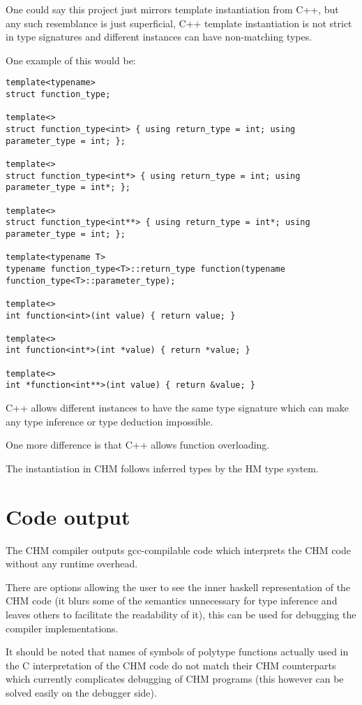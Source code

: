 One could say this project just mirrors template instantiation from C++, but any such resemblance is just superficial, C++ template instantiation is not strict in type signatures and different instances can have
non-matching types.

One example of this would be:


\begin{lstlisting}
template<typename>
struct function_type;

template<>
struct function_type<int> { using return_type = int; using parameter_type = int; };

template<>
struct function_type<int*> { using return_type = int; using parameter_type = int*; };

template<>
struct function_type<int**> { using return_type = int*; using parameter_type = int; };

template<typename T>
typename function_type<T>::return_type function(typename function_type<T>::parameter_type);

template<>
int function<int>(int value) { return value; }

template<>
int function<int*>(int *value) { return *value; }

template<>
int *function<int**>(int value) { return &value; }
\end{lstlisting}

C++ allows different instances to have the same type signature which can make any type inference or type deduction impossible.

One more difference is that C++ allows function overloading. %

The instantiation in CHM follows inferred types by the HM type system.

\section{Code output}

The CHM compiler outputs gcc-compilable code which interprets the CHM code without any runtime overhead. %

There are options allowing the user to see the inner haskell representation of the CHM code (it blurs some of the semantics unnecessary for type inference and leaves others to facilitate the readability of it), this can be used for debugging the compiler implementations. %

It should be noted that names of symbols of polytype functions actually used in the C interpretation of the CHM code do not match their CHM counterparts which currently complicates debugging of CHM programs (this however can be solved easily on the debugger side).
